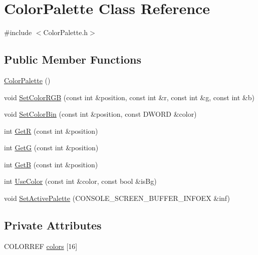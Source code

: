 \hypertarget{class_color_palette}{}\section{Color\+Palette Class Reference}
\label{class_color_palette}


{\ttfamily \#include $<$Color\+Palette.\+h$>$}

\subsection*{Public Member Functions}
\begin{DoxyCompactItemize}
\item 
\hyperlink{class_color_palette_a2851f9af4d13c5d760e36f6863bcffef}{Color\+Palette} ()
\item 
void \hyperlink{class_color_palette_a81501256f95cdfa7247e301967ffe6e1}{Set\+Color\+R\+GB} (const int \&position, const int \&r, const int \&g, const int \&b)
\item 
void \hyperlink{class_color_palette_af3088949ba7d3bb1905669ca2440ce1d}{Set\+Color\+Bin} (const int \&position, const D\+W\+O\+RD \&color)
\item 
int \hyperlink{class_color_palette_a959c1d41f6231f92845d1c0b7984fc53}{GetR} (const int \&position)
\item 
int \hyperlink{class_color_palette_a2901366053f40b9a017058e2593e237a}{GetG} (const int \&position)
\item 
int \hyperlink{class_color_palette_a51e71ba4f32b9240d63a7db8d54bbe60}{GetB} (const int \&position)
\item 
int \hyperlink{class_color_palette_a835334e6ce47a471f59055c247e05246}{Use\+Color} (const int \&color, const bool \&is\+Bg)
\item 
void \hyperlink{class_color_palette_a4b335580203b6ef05d84e282fcbaed41}{Set\+Active\+Palette} (C\+O\+N\+S\+O\+L\+E\+\_\+\+S\+C\+R\+E\+E\+N\+\_\+\+B\+U\+F\+F\+E\+R\+\_\+\+I\+N\+F\+O\+EX \&inf)
\end{DoxyCompactItemize}
\subsection*{Private Attributes}
\begin{DoxyCompactItemize}
\item 
C\+O\+L\+O\+R\+R\+EF \hyperlink{class_color_palette_a4b12c031bcb8ccac141bca27bebefae5}{colors} \mbox{[}16\mbox{]}
\end{DoxyCompactItemize}



